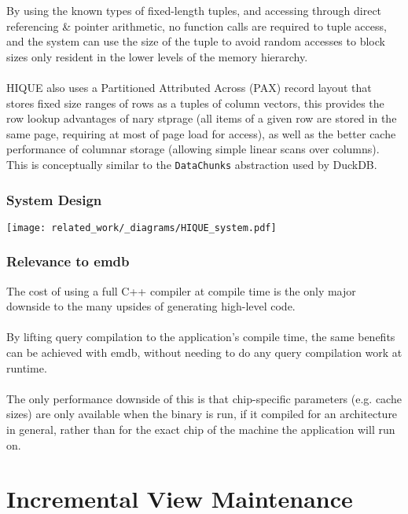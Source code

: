 By using the known types of fixed-length tuples, and accessing through direct referencing \& pointer arithmetic, no function calls are required to tuple access, and the system can use the size of the tuple to avoid random accesses to block sizes only resident in the lower levels of the memory hierarchy.
\\
\\ HIQUE also uses a Partitioned Attributed Across (PAX) record layout\cite{PAXStorageModel} that stores fixed size ranges of rows as a tuples of column vectors, this provides the row lookup advantages of nary stprage (all items of a given row are stored in the same page, requiring at most of page load for access), as well as the better cache performance of columnar storage (allowing simple linear scans over columns). This is conceptually similar to the \texttt{DataChunks} abstraction used by DuckDB.
\subsubsection{System Design}
\begin{center}
    \texttt{[image: related\_work/\_diagrams/HIQUE\_system.pdf]}
\end{center}
\subsubsection{Relevance to emdb}
The cost of using a full C++ compiler at compile time is the only major downside to the many upsides of generating high-level code.
\\
\\ By lifting query compilation to the application's compile time, the same benefits can be achieved with emdb, without needing to do any query compilation work at runtime.
\\
\\ The only performance downside of this is that chip-specific parameters (e.g. cache sizes) are only available when the binary is run, if it compiled for an architecture in general, rather than for the exact chip of the machine the application will run on.

\section{Incremental View Maintenance}

